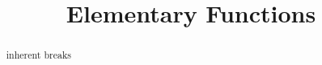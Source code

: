 \documentclass{ximera}
\title{Elementary Functions}
\begin{document}
\begin{abstract}
inherent breaks
\end{abstract}
\maketitle
\end{document}
